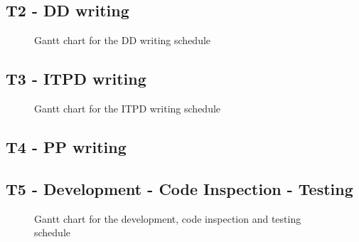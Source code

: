 \documentclass[english]{article}
\begin{document}
\subsection{T2 - DD writing}

\begin{figure}[H]
	\centering
	\caption{Gantt chart for the DD writing schedule}
\end{figure}

\subsection{T3 - ITPD writing}

\begin{figure}[H]
	\centering
	\caption{Gantt chart for the ITPD writing schedule}
\end{figure}

\subsection{T4 - PP writing}


\subsection{T5 - Development - Code Inspection -  Testing}

\begin{figure}[H]
	\centering
	\caption{Gantt chart for the development, code inspection and testing schedule}
\end{figure}
\end{document}

